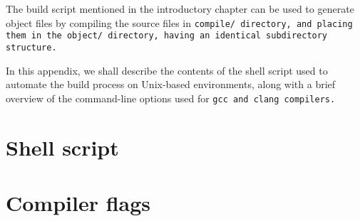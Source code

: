 \def\Section#1{\section{#1}}

The build script mentioned in the introductory chapter can be used to generate
object files by compiling the source files in \tt{compile/} directory, and placing
them in the \tt{object/} directory, having an identical subdirectory structure.

In this appendix, we shall describe the contents of the shell script used
to automate the build process on Unix-based environments, along with a brief
overview of the command-line options used for \tt{gcc} and \tt{clang} compilers.

\Section{Shell script}

\Section{Compiler flags}
